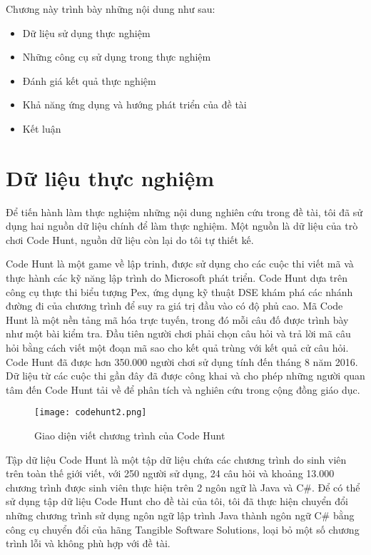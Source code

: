 Chương này trình bày những nội dung như sau:
\begin{itemize}
	\item Dữ liệu sử dụng thực nghiệm
	\item Những công cụ sử dụng trong thực nghiệm
	\item Đánh giá kết quả thực nghiệm
	\item Khả năng ứng dụng và hướng phát triển của đề tài
	\item Kết luận
\end{itemize}



\section{Dữ liệu thực nghiệm}
Để tiến hành làm thực nghiệm những nội dung nghiên cứu trong đề tài, tôi đã sử dụng hai nguồn dữ liệu chính để làm thực nghiệm. Một nguồn là dữ liệu của trò chơi Code Hunt, nguồn dữ liệu còn lại do tôi tự thiết kế.

Code Hunt \cite{CodeHunt} là một game về lập trinh, được sử dụng cho các cuộc thi viết mã và thực hành các kỹ năng lập trình do Microsoft phát triển. Code Hunt dựa trên công cụ thực thi biểu tượng Pex, ứng dụng kỹ thuật DSE khám phá các nhánh đường đi của chương trình để suy ra giá trị đầu vào có độ phủ cao. Mã Code Hunt là một nền tảng mã hóa trực tuyến, trong đó mỗi câu đố được trình bày như một bài kiểm tra. Đầu tiên người chơi phải chọn câu hỏi và trả lời mã câu hỏi bằng cách viết một đoạn mã sao cho kết quả trùng với kết quả cử câu hỏi. Code Hunt đã được hơn 350.000 người chơi sử dụng tính đến tháng 8 năm 2016. Dữ liệu từ các cuộc thi gần đây đã được công khai và cho phép những người quan tâm đến Code Hunt tải về để phân tích và nghiên cứu trong cộng đồng giáo dục.

\label{sec:data}
\begin{center}
	\begin{figure}[h]
		\begin{center}
			\texttt{[image: codehunt2.png]}
		\end{center}
		\caption{Giao diện viết chương trình của Code Hunt}
		\label{refhinh1}
	\end{figure}
\end{center}


Tập dữ liệu Code Hunt là một tập dữ liệu chứa các chương trình do sinh viên trên toàn thế giới viết, với 250 người sử dụng, 24 câu hỏi và khoảng 13.000 chương trình được sinh viên thực hiện trên 2 ngôn ngữ là Java và C\#. Để có thể sử dụng tập dữ liệu Code Hunt cho đề tài của tôi, tôi đã thực hiện chuyển đổi những chương trình sử dụng ngôn ngữ lập trình Java thành ngôn ngữ C\# bằng công cụ chuyển đổi của hãng Tangible Software Solutions, loại bỏ một số chương trình lỗi và không phù hợp với đề tài.


